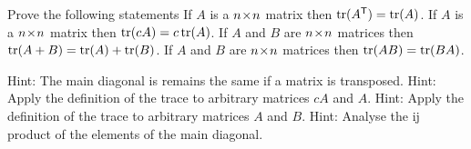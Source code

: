 
\begin{Exercise}[
name={},
title={}, 
difficulty=0,
origin={\cite{YL}}]
Prove the following statements
\Question If $A$ is a $n \! \times \! n$ matrix then $\operatorname{tr}({{A}^{\mathsf{T}}})=\operatorname{tr}(A)$.
\Question If $A$ is a $n \! \times \! n$ matrix then $\operatorname{tr}(cA)=c\operatorname{tr}(A)$.
\Question If $A$ and $B$ are $n \! \times \! n$ matrices then $\operatorname{tr}(A+B)=\operatorname{tr}(A)+\operatorname{tr}(B)$.
\Question If $A$ and $B$ are $n \! \times \! n$ matrices then $\operatorname{tr}(AB)=\operatorname{tr}(BA)$.
\end{Exercise}

\begin{Answer}
\Question Hint: The main diagonal is remains the same if a matrix is transposed.
\Question Hint: Apply the definition of the trace to arbitrary matrices $cA$ and $A$. 
\Question Hint: Apply the definition of the trace to arbitrary matrices $A$ and $B$.
\Question Hint: Analyse the ij product of the elements of the main diagonal.
\end{Answer}
